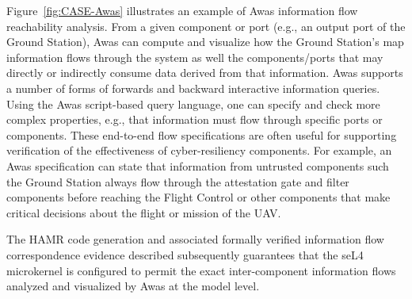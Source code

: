Figure~\ref{fig:CASE-Awas} illustrates an example of Awas information flow reachability analysis.
From a given component or port (e.g., an output port of the Ground Station),
Awas can compute and visualize how the Ground Station’s map information flows through the system
as well the components/ports that may directly or indirectly consume data derived from that information.
Awas supports a number of forms of forwards and backward interactive information queries.
Using the Awas script-based query language, one can specify and check more complex properties, e.g.,
that information must flow through specific ports or components.
These end-to-end flow specifications are often useful for supporting verification of the
effectiveness of cyber-resiliency components.   For example, an Awas specification can state that
information from untrusted components such the Ground Station always flow through the
attestation gate and filter components before reaching the Flight Control or other components
that make critical decisions about the flight or mission of the UAV.

The HAMR code generation and associated formally verified information
flow correspondence evidence described subsequently
guarantees that the seL4 microkernel is configured to permit the exact
inter-component information flows analyzed and visualized by Awas at
the model level.